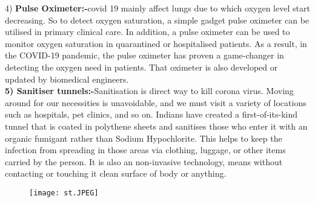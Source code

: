 \documentclass[12pt]{article}
\begin{document}
\clearpage


4) \textbf{Pulse Oximeter:-}covid 19 mainly affect lungs due to which oxygen level start decreasing. So to detect oxygen saturation, a simple gadget pulse oximeter can be utilised in primary clinical care. In addition, a pulse oximeter can be used to monitor oxygen saturation in quarantined or hospitalised patients. As a result, in the COVID-19 pandemic, the pulse oximeter has proven a game-changer in detecting the oxygen need in patients. That oximeter is also developed or updated by biomedical engineers.\\

\textbf{5) Sanitiser tunnels:-}Sanitisation is direct way to kill corona virus.  Moving around for our necessities is unavoidable, and we must visit a variety of locations such as hospitals, pet clinics, and so on.
Indians have created a first-of-its-kind tunnel that is coated in polythene sheets and sanitises those who enter it with an organic fumigant rather than Sodium Hypochlorite.
This helps to keep the infection from spreading in those areas via clothing, luggage, or other items carried by the person. It is also an  non-invasive technology, means without contacting or touching it clean surface of body or anything. 

\begin{figure}[h]
\centering
\texttt{[image: st.JPEG]}
\end{figure}
\end{document}
